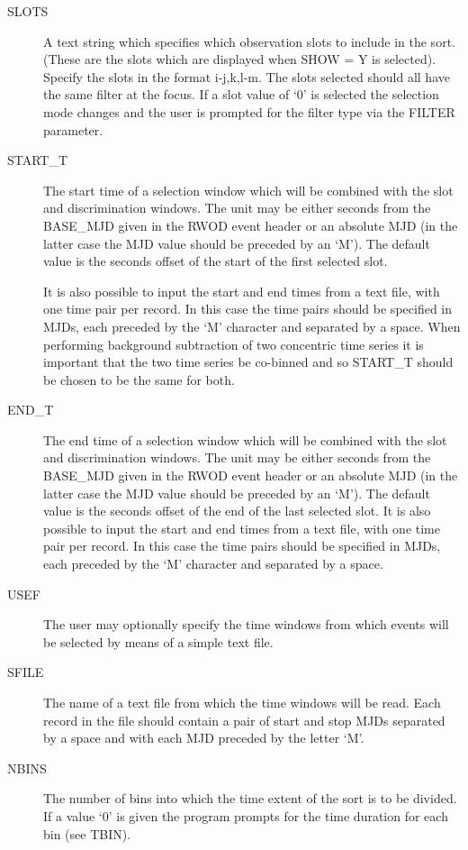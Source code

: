\begin{description}
\item[SLOTS]
A text string which specifies which observation slots to include in
the sort. (These are the slots which are displayed when SHOW = Y is selected).
Specify the slots in the format i-j,k,l-m. The slots selected
should all have the same filter at the focus. If a slot value of `0' is
selected the selection mode changes and the user is prompted for the 
filter type via the FILTER parameter.

\item[START\_T]
The start time of a selection window which will be combined with the
slot and discrimination windows. The unit may be either seconds from
the BASE\_MJD given in the RWOD event header or an absolute MJD (in the
latter case the MJD value should be preceded by an `M').  The default
value is the seconds offset of the start of the first selected slot.

It is also possible to input the start and end times from a text file,
with one time pair per record. In this case the time pairs should be
specified in MJDs, each preceded by the `M' character and separated by
a space. When performing background subtraction of two concentric time
series it is important that the two time series be co-binned and so
START\_T should be chosen to be the same for both.

\item[END\_T ]
The end time of a selection window which will be combined with the slot
and discrimination windows. The unit may be either seconds from the
BASE\_MJD given in the RWOD event header or an absolute MJD (in the
latter case the MJD value should be preceded by an `M'). The default
value is the seconds offset of the end of the last selected slot. It is
also possible to input the start and end times from a text file, with
one time pair per record. In this case the time pairs should be
specified in MJDs, each preceded by the `M' character and separated by
a space.

\item[USEF]
The user may optionally specify the time windows from which events
will be selected by means of a simple text file.

\item[SFILE]
The name of a text file from which the time windows will be read.
Each record in the file should contain a pair of start and stop MJDs
separated by a space and with each MJD preceded by the letter `M'.

\item[NBINS]
The number of bins into which the time extent of the sort 
is to be divided. If a value `0' is given the program prompts for the
time duration for each bin (see TBIN).


\end{description}
